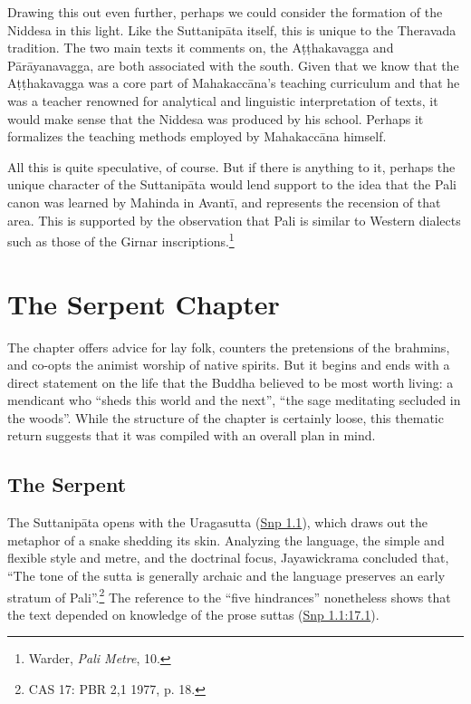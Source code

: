 \documentclass[12pt,openany]{book}%
\begin{document}
Drawing this out even further, perhaps we could consider the formation of the Niddesa in this light. Like the \textsanskrit{Suttanipāta} itself, this is unique to the Theravada tradition. The two main texts it comments on, the \textsanskrit{Aṭṭhakavagga} and \textsanskrit{Pārāyanavagga}, are both associated with the south. Given that we know that the \textsanskrit{Aṭṭhakavagga} was a core part of \textsanskrit{Mahakaccāna}’s teaching curriculum and that he was a teacher renowned for analytical and linguistic interpretation of texts, it would make sense that the Niddesa was produced by his school. Perhaps it formalizes the teaching methods employed by \textsanskrit{Mahakaccāna} himself.

All this is quite speculative, of course. But if there is anything to it, perhaps the unique character of the \textsanskrit{Suttanipāta} would lend support to the idea that the Pali canon was learned by Mahinda in \textsanskrit{Avantī}, and represents the recension of that area. This is supported by the observation that Pali is similar to Western dialects such as those of the Girnar inscriptions.\footnote{Warder, \textit{Pali Metre}, 10. }

\section*{The Serpent Chapter}

The chapter offers advice for lay folk, counters the pretensions of the brahmins, and co-opts the animist worship of native spirits. But it begins and ends with a direct statement on the life that the Buddha believed to be most worth living: a mendicant who “sheds this world and the next”, “the sage meditating secluded in the woods”. While the structure of the chapter is certainly loose, this thematic return suggests that it was compiled with an overall plan in mind.

\subsection*{The Serpent}

The \textsanskrit{Suttanipāta} opens with the Uragasutta (\href{https://suttacentral.net/snp1.1/en/sujato}{Snp 1.1}), which draws out the metaphor of a snake shedding its skin. Analyzing the language, the simple and flexible style and metre, and the doctrinal focus, Jayawickrama concluded that, “The tone of the sutta is generally archaic and the language preserves an early stratum of Pali”.\footnote{CAS 17: PBR 2,1 1977, p. 18. } The reference to the “five hindrances” nonetheless shows that the text depended on knowledge of the prose suttas (\href{https://suttacentral.net/snp1.1/en/sujato\#17.1}{Snp 1.1:17.1}).
\end{document}
